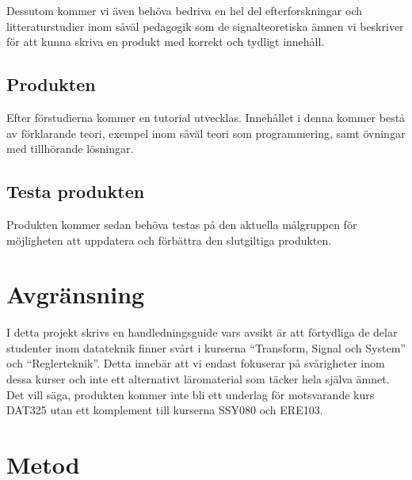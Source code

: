 \documentclass{article}
\begin{document}
Dessutom kommer vi även behöva bedriva en hel del efterforskningar
och litteraturstudier inom såväl pedagogik som de signalteoretiska
ämnen vi beskriver för att kunna skriva en produkt med korrekt och
tydligt innehåll.

\subsection{Produkten}
Efter förstudierna kommer en tutorial utvecklas.
%
Innehållet i denna kommer bestå av förklarande teori,
exempel inom såväl teori som programmering, samt övningar
med tillhörande lösningar.

\subsection{Testa produkten}
Produkten kommer sedan behöva testas på den aktuella målgruppen för
möjligheten att uppdatera och förbättra den slutgiltiga produkten.

\section{Avgränsning}
I detta projekt skrivs en handledningsguide vars avsikt är att
förtydliga de delar studenter inom datateknik finner svårt i kurserna
“Transform, Signal och System” och “Reglerteknik”.
%
Detta innebär att vi endast fokuserar på svårigheter inom dessa kurser
och inte ett alternativt läromaterial som täcker hela själva ämnet.
%
Det vill säga, produkten kommer inte bli ett underlag för motsvarande
kurs DAT325 utan ett komplement till kurserna SSY080 och ERE103.

\section{Metod}
\end{document}

